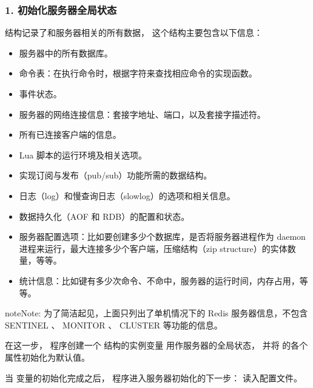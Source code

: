 \documentclass[a4paper,11pt,english]{sphinxmanual}
\begin{document}
\subsubsection{1. 初始化服务器全局状态}
\label{internal/redis:id3}
 结构记录了和服务器相关的所有数据，
这个结构主要包含以下信息：
\begin{itemize}
\item {} 
服务器中的所有数据库。

\item {} 
命令表：在执行命令时，根据字符来查找相应命令的实现函数。

\item {} 
事件状态。

\item {} 
服务器的网络连接信息：套接字地址、端口，以及套接字描述符。

\item {} 
所有已连接客户端的信息。

\item {} 
Lua 脚本的运行环境及相关选项。

\item {} 
实现订阅与发布（pub/sub）功能所需的数据结构。

\item {} 
日志（log）和慢查询日志（slowlog）的选项和相关信息。

\item {} 
数据持久化（AOF 和 RDB）的配置和状态。

\item {} 
服务器配置选项：比如要创建多少个数据库，是否将服务器进程作为 daemon 进程来运行，最大连接多少个客户端，压缩结构（zip structure）的实体数量，等等。

\item {} 
统计信息：比如键有多少次命令、不命中，服务器的运行时间，内存占用，等等。

\end{itemize}

\begin{notice}{note}{Note:}
为了简洁起见，上面只列出了单机情况下的 Redis 服务器信息，不包含 SENTINEL 、 MONITOR 、 CLUSTER 等功能的信息。
\end{notice}

在这一步，
程序创建一个  结构的实例变量  用作服务器的全局状态，
并将  的各个属性初始化为默认值。

当  变量的初始化完成之后，
程序进入服务器初始化的下一步：
读入配置文件。
\end{document}
